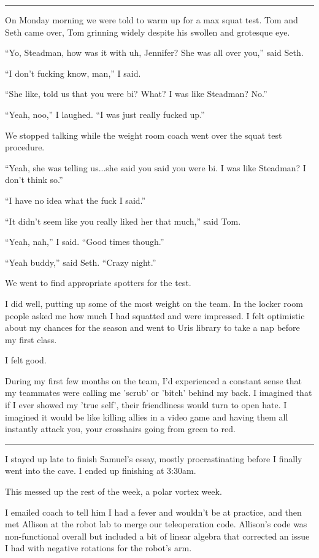 \plainfancybreak{12pt}{2}{* * *}

On Monday morning we were told to warm up for a max squat test.  Tom and Seth
came over, Tom grinning widely despite his swollen and grotesque eye.

``Yo, Steadman, how was it with uh, Jennifer?  She was all over you,'' said
Seth.

``I don't fucking know, man,'' I said.

``She like, told us that you were bi?  What?  I was like Steadman?  No.''

``Yeah, noo,'' I laughed. ``I was just really fucked up.''

We stopped talking while the weight room coach went over the squat test
procedure. 

``Yeah, she was telling us...she said you said you were bi.  I was like
Steadman?  I don't think so.''

``I have no idea what the fuck I said.''

``It didn't seem like you really liked her that much,'' said Tom.

``Yeah, nah,'' I said.  ``Good times though.''

``Yeah buddy,'' said Seth.  ``Crazy night.'' 

We went to find appropriate spotters for the test.

I did well, putting up some of the most weight on the team.  In the locker room
people asked me how much I had squatted and were impressed.  I felt optimistic
about my chances for the season and went to Uris library to take a nap before my
first class.

I felt good.

During my first few months on the team, I'd experienced a constant sense that my
teammates were calling me 'scrub' or 'bitch' behind my back.  I imagined that if
I ever showed my 'true self', their friendliness would turn to open hate.  I
imagined it would be like killing allies in a video game and having them all
instantly attack you, your crosshairs going from green to red. 

\plainfancybreak{12pt}{2}{* * *}

I stayed up late to finish Samuel's essay, mostly procrastinating before I
finally went into the cave.  I ended up finishing at 3:30am.

This messed up the rest of the week, a polar vortex week.

I emailed coach to tell him I had a fever and wouldn't be at practice, and then
met Allison at the robot lab to merge our teleoperation code.   Allison's code
was non-functional overall but included a bit of linear algebra that corrected
an issue I had with negative rotations for the robot's arm.

